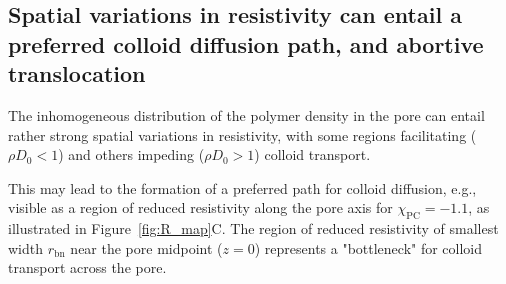 \documentclass[12pt, a4paper]{article}
\begin{document}




\subsection{Spatial variations in resistivity can entail a preferred colloid diffusion path, and abortive translocation}

 The inhomogeneous distribution of the polymer density in the pore can entail rather strong spatial variations in resistivity, with some regions facilitating ($\rho D_0 < 1$) and others impeding ($\rho D_0 > 1$) colloid transport.

This may lead to the formation of a preferred path for colloid diffusion, e.g., visible as a region of reduced resistivity along the pore axis for $\chi_{\text{PC}} = -1.1$, as illustrated in Figure~\ref{fig:R_map}C.
The region of reduced resistivity of smallest width $r_{\text{bn}}$ near the pore midpoint ($z=0$) represents a "bottleneck" for colloid transport across the pore.

\end{document}
